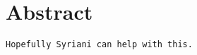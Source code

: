 \section{Abstract}
\label{sec:abstract}

\begin{verbatim}
Hopefully Syriani can help with this.
\end{verbatim}
